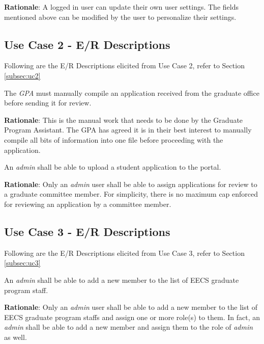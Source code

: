 \documentclass[fontsize=12pt,paper=letter,twoside]{scrartcl}
\begin{document}
\smallskip
\noindent \textbf{Rationale}: A logged in user can update their own user settings. The fields mentioned above can be modified by the user to personalize their settings.


\subsection{Use Case 2 - E/R Descriptions}

Following are the E/R Descriptions elicited from Use Case 2, refer to Section \ref{subsec:uc2}

\genenv
{The \emph{GPA} must manually compile an application received from the graduate office before sending it for review. \\}
{}
\label{E3}

\smallskip
\noindent \textbf{Rationale}: This is the manual work that needs to be done by the Graduate Program Assistant. The GPA has agreed it is in their best interest to manually compile all bits of information into one file before proceeding with the application.

\genreq
{An \emph{admin} shall be able to upload a student application to the portal.\\}
{}
\label{R7}

\smallskip
\noindent \textbf{Rationale}: Only an \emph{admin} user shall be able to assign applications for review to a graduate committee member. For simplicity, there is no maximum cap enforced for reviewing an application by a committee member.



\subsection{Use Case 3 - E/R Descriptions}

Following are the E/R Descriptions elicited from Use Case 3, refer to Section \ref{subsec:uc3}

\genreq
{An \emph{admin} shall be able to add a new member to the list of EECS graduate program staff.\\}
{}
\label{R8}

\smallskip
\noindent \textbf{Rationale}: Only an \emph{admin} user shall be able to add a new member to the list of EECS graduate program staffs and assign one or more role(s) to them. In fact, an \emph{admin} shall be able to add a new member and assign them to the role of \emph{admin} as well.
\end{document}
